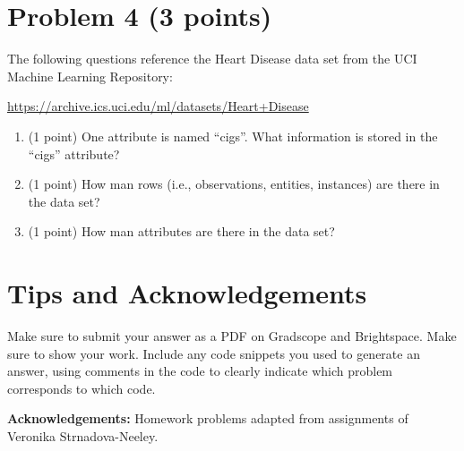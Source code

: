\documentclass[11pt]{article}
\begin{document}
\newpage
\section*{Problem 4 (3 points)}

The following questions reference the Heart Disease data set from the UCI
Machine Learning Repository:

\url{https://archive.ics.uci.edu/ml/datasets/Heart+Disease}

\begin{enumerate}
    \item (1 point) One attribute is named ``cigs''.  What information is stored
    in the ``cigs'' attribute?
    \item (1 point) How man rows (i.e., observations, entities, instances) are
    there in the data set?
    \item (1 point) How man attributes are there in the data set?
\end{enumerate}

\section*{Tips and Acknowledgements}

Make sure to submit your answer as a PDF on Gradscope and Brightspace. Make sure
to show your work. Include any code snippets you used to generate an answer,
using comments in the code to clearly indicate which problem corresponds to
which code.


{\bf Acknowledgements:} Homework problems adapted from assignments of
Veronika Strnadova-Neeley.
\end{document}
